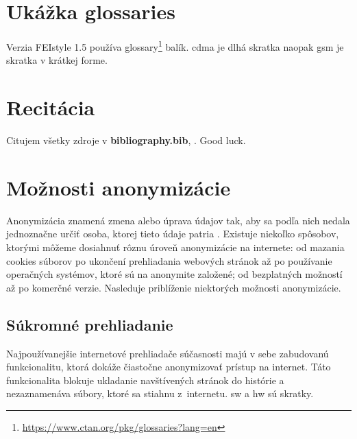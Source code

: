 \section{Ukážka glossaries}
\noindent Verzia FEIstyle 1.5 používa glossary\footnote{\url{https://www.ctan.org/pkg/glossaries?lang=en}} balík.
\acrfull{cdma} je dlhá skratka naopak \acrshort{gsm} je skratka v krátkej forme.
\section{Recitácia}
Citujem všetky zdroje v \textbf{bibliography.bib}, \cite{t00, t01, t02, t03, kniha, kniha2, kniha3, small, big, cs, koll, kap, tug, knuth, zbornik, prispevok}. \newline Good luck.
\section{Možnosti anonymizácie}
\noindent Anonymizácia znamená zmena alebo úprava údajov tak, aby sa podľa nich nedala jednoznačne určiť osoba, ktorej tieto údaje patria \cite{t01}. Existuje niekoľko spôsobov, ktorými môžeme dosiahnuť rôznu úroveň anonymizácie na internete: od mazania cookies súborov po ukončení prehliadania webových stránok až po používanie operačných systémov, ktoré sú na anonymite založené; od bezplatných možností až po komerčné verzie.  
\newline Nasleduje priblíženie niektorých možnosti anonymizácie.

\subsection{Súkromné prehliadanie}
\noindent Najpoužívanejšie internetové prehliadače súčasnosti majú v sebe zabudovanú funkcionalitu, ktorá dokáže čiastočne anonymizovať prístup na internet. Táto funkcionalita blokuje ukladanie navštívených stránok do histórie a nezaznamenáva súbory, ktoré sa stiahnu z~internetu. \acrshort{sw} a \acrlong{hw} sú skratky.

